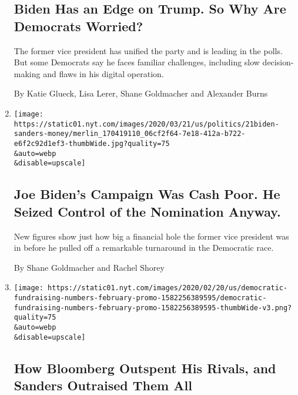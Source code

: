 \begin{enumerate}
  \hypertarget{biden-has-an-edge-on-trump-so-why-are-democrats-worried}{%
  \subsection{Biden Has an Edge on Trump. So Why Are Democrats
  Worried?}\label{biden-has-an-edge-on-trump-so-why-are-democrats-worried}}

  The former vice president has unified the party and is leading in the
  polls. But some Democrats say he faces familiar challenges, including
  slow decision-making and flaws in his digital operation.

  By Katie Glueck, Lisa Lerer, Shane Goldmacher and Alexander Burns
\item
  \href{/2020/03/21/us/politics/biden-sanders-fund-raising.html}{}

  \texttt{[image: https://static01.nyt.com/images/2020/03/21/us/politics/21biden-sanders-money/merlin\_170419110\_06cf2f64-7e18-412a-b722-e6f2c92d1ef3-thumbWide.jpg?quality=75\\\&auto=webp\\\&disable=upscale]}

  \hypertarget{joe-bidens-campaign-was-cash-poor-he-seized-control-of-the-nomination-anyway}{%
  \subsection{Joe Biden's Campaign Was Cash Poor. He Seized Control of
  the Nomination
  Anyway.}\label{joe-bidens-campaign-was-cash-poor-he-seized-control-of-the-nomination-anyway}}

  New figures show just how big a financial hole the former vice
  president was in before he pulled off a remarkable turnaround in the
  Democratic race.

  By Shane Goldmacher and Rachel Shorey
\item
  \href{/interactive/2020/02/21/us/politics/democratic-fundraising-numbers-february.html}{}

  \texttt{[image: https://static01.nyt.com/images/2020/02/20/us/democratic-fundraising-numbers-february-promo-1582256389595/democratic-fundraising-numbers-february-promo-1582256389595-thumbWide-v3.png?quality=75\\\&auto=webp\\\&disable=upscale]}

  \hypertarget{how-bloomberg-outspent-his-rivals-and-sanders-outraised-them-all}{%
  \subsection{How Bloomberg Outspent His Rivals, and Sanders Outraised
  Them
  All}\label{how-bloomberg-outspent-his-rivals-and-sanders-outraised-them-all}}


\end{enumerate}
